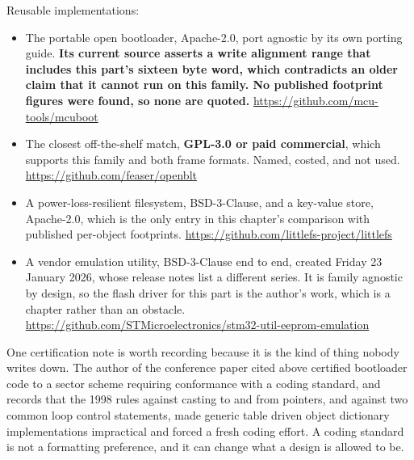 Reusable implementations:
\begin{itemize}
\item The portable open bootloader, Apache-2.0, port agnostic by its own porting
guide. \textbf{Its current source asserts a write alignment range that includes
this part's sixteen byte word, which contradicts an older claim that it cannot
run on this family. No published footprint figures were found, so none are
quoted.}\newline
\url{https://github.com/mcu-tools/mcuboot}
\item The closest off-the-shelf match, \textbf{GPL-3.0 or paid commercial}, which
supports this family and both frame formats. Named, costed, and not used.\newline
\url{https://github.com/feaser/openblt}
\item A power-loss-resilient filesystem, BSD-3-Clause, and a key-value store,
Apache-2.0, which is the only entry in this chapter's comparison with published
per-object footprints.\newline
\url{https://github.com/littlefs-project/littlefs}
\item A vendor emulation utility, BSD-3-Clause end to end, created Friday 23
January 2026, whose release notes list a different series. It is family agnostic
by design, so the flash driver for this part is the author's work, which is a
chapter rather than an obstacle.\newline
\url{https://github.com/STMicroelectronics/stm32-util-eeprom-emulation}
\end{itemize}

One certification note is worth recording because it is the kind of thing nobody
writes down. The author of the conference paper cited above certified bootloader
code to a sector scheme requiring conformance with a coding standard, and
records that the 1998 rules against casting to and from pointers, and against two
common loop control statements, made generic table driven object dictionary
implementations impractical and forced a fresh coding effort. A coding standard
is not a formatting preference, and it can change what a design is allowed to be.

